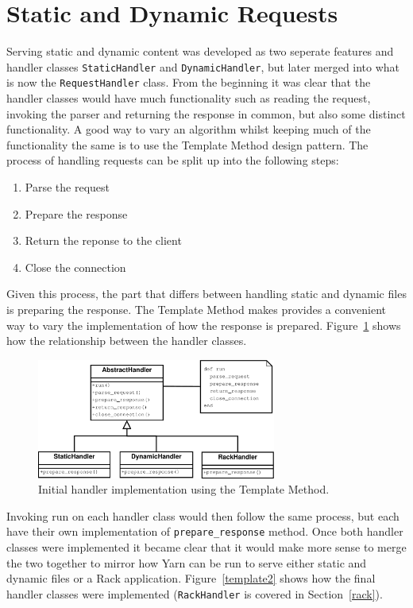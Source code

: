 \section{Static and Dynamic Requests}
Serving static and dynamic content was developed as two seperate features and
handler classes \texttt{StaticHandler} and \texttt{DynamicHandler}, but
later merged into what is now the \texttt{RequestHandler} class. From the
beginning it was clear that the handler classes would have much functionality
such as reading the request, invoking the parser and returning the response in
common, but also some distinct functionality. A good way to vary an algorithm
whilst keeping much of the functionality the same is to use the Template
Method design pattern. The process of handling requests can be split up into
the following steps:

\begin{enumerate}
  \item Parse the request
  \item Prepare the response
  \item Return the reponse to the client
  \item Close the connection
\end{enumerate}

Given this process, the part that differs between handling static and dynamic
files is preparing the response. The Template Method makes provides a
convenient way to vary the implementation of how the response is prepared.
Figure~\ref{template} shows how the relationship between the handler classes.

\begin{figure}[htb]
  \centering
  \includegraphics[width=0.7\textwidth]{diagrams/handlers.pdf}
  \caption{Initial handler implementation using the Template Method.}
  \label{template}
\end{figure}

Invoking run on each handler class would then follow the same process, but
each have their own implementation of \texttt{prepare\_response} method. Once
both handler classes were implemented it became clear that it would make more
sense to merge the two together to mirror how Yarn can be run to serve either
static and dynamic files or a Rack application. Figure~\ref{template2} shows
how the final handler classes were implemented (\texttt{RackHandler} is
covered in Section~\ref{rack}).

